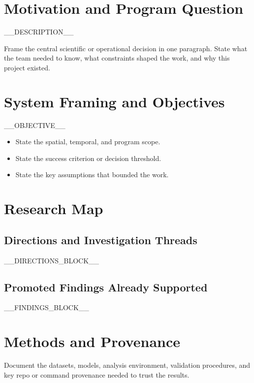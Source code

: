\documentclass[8pt,twocolumn]{extarticle}
\newcommand{\placeholder}[1]{\textcolor{SondeMuted}{#1}}
\begin{document}
\section*{Motivation and Program Question}

__DESCRIPTION__

\vspace{0.35em}
Frame the central scientific or operational decision in one paragraph. State what the team needed to know, what constraints shaped the work, and why this project existed.

\section*{System Framing and Objectives}

__OBJECTIVE__

\vspace{0.35em}
\begin{itemize}
  \item \placeholder{State the spatial, temporal, and program scope.}
  \item \placeholder{State the success criterion or decision threshold.}
  \item \placeholder{State the key assumptions that bounded the work.}
\end{itemize}

\section*{Research Map}

\subsection*{Directions and Investigation Threads}
__DIRECTIONS_BLOCK__

\subsection*{Promoted Findings Already Supported}
__FINDINGS_BLOCK__

\section*{Methods and Provenance}

\placeholder{Document the datasets, models, analysis environment, validation procedures, and key repo or command provenance needed to trust the results.}
\end{document}
